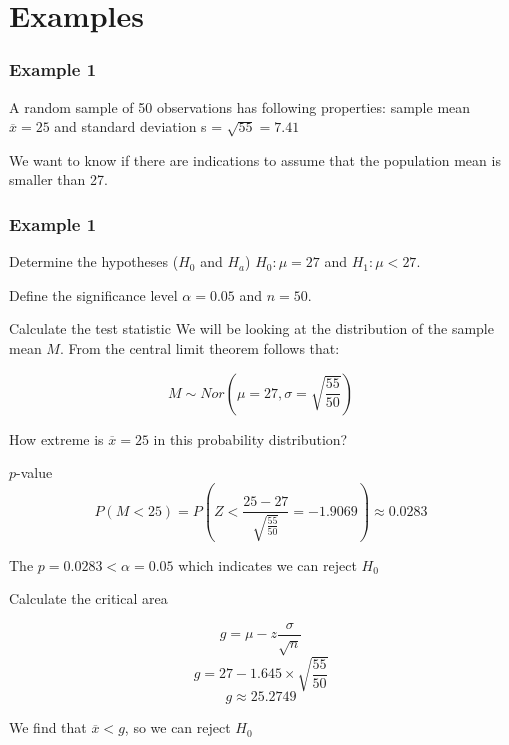 \documentclass{beamer}
\begin{document}
\section{Examples}
\sectionframelogo{}

\begin{frame}
  \frametitle{Example 1}
  A random sample of 50 observations has following properties: sample mean $\overline{x} = 25$ and standard deviation s = $\sqrt{55} = 7.41$
  
  We want to know if there are indications to assume that the population mean is smaller than 27.
\end{frame}

\begin{frame}
  \frametitle{Example 1}
  \begin{block}{Determine the hypotheses ($H_0$ and $H_a$)}
    $H_{0} : \mu = 27$ and $H_{1}: \mu < 27$.
  \end{block}


  \begin{block}{Define the significance level}
  $\alpha = 0.05$ and $n=50$.
  \end{block}


  \begin{block}{Calculate the test statistic}
    We will be looking at the distribution of the sample mean $M$. From the central limit theorem follows that:

    \[ M \sim Nor(\mu = 27, \sigma = \sqrt{\frac{55}{50}}) \]
    
    How extreme is $\overline{x}= 25$ in this probability distribution?
  \end{block}
\end{frame}

\begin{frame}
  \begin{block}{$p$-value}
    \[ P(M < 25) = P \left(Z < \frac{25 - 27}{\sqrt{\frac{55}{50}}} = -1.9069 \right) \approx 0.0283  \]
    
    The $p = 0.0283 < \alpha = 0.05$ which indicates we can reject  $H_{0}$
    \end{block}
  
    \begin{block}{Calculate the critical area}
    
    \[ g = \mu - z \frac{\sigma}{\sqrt{n}} \]
    \[ g = 27 - 1.645 \times \sqrt{\frac{55}{50}} \]
    \[ g \approx 25.2749 \]
  
    We find that $\overline{x} < g$, so we can reject $H_{0}$
  \end{block}

\end{frame}
\end{document}
